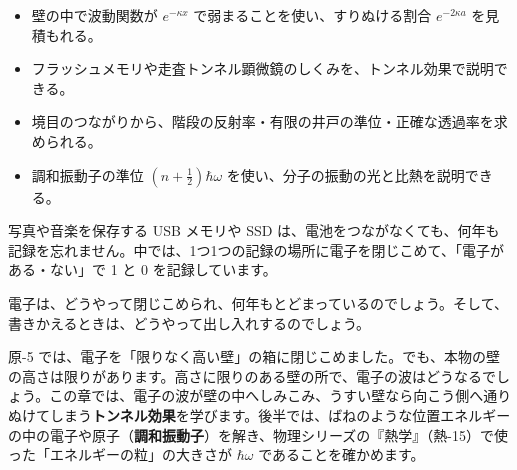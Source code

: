 \begin{goal}
\begin{itemize}[label={\color{bkTheme}●}, leftmargin=1.6\zw, itemsep=0pt, topsep=1pt]
\item {}\enspace 壁の中で波動関数が $e^{-\kappa x}$ で弱まることを使い、すりぬける割合 $e^{-2\kappa a}$ を見積もれる。
\item {}\enspace フラッシュメモリや走査トンネル顕微鏡のしくみを、トンネル効果で説明できる。
\item {}\enspace 境目のつながりから、階段の反射率・有限の井戸の準位・正確な透過率を求められる。
\item {}\enspace 調和振動子の準位 $(n+\tfrac12)\hbar\omega$ を使い、分子の振動の光と比熱を説明できる。
\end{itemize}
\end{goal}

\begin{hatena}
\noindent\begin{minipage}[c]{0.52\linewidth}\raggedright
写真や音楽を保存する USB メモリや SSD は、電池をつながなくても、何年も記録を忘れません。中では、1つ1つの記録の場所に電子を閉じこめて、「電子がある・ない」で 1 と 0 を記録しています。

電子は、どうやって閉じこめられ、何年もとどまっているのでしょう。そして、書きかえるときは、どうやって出し入れするのでしょう。
\end{minipage}\hfill
\begin{minipage}[c]{0.45\linewidth}\centering
{}
\end{minipage}
\end{hatena}

\noindent 原-5 では、電子を「限りなく高い壁」の箱に閉じこめました。でも、本物の壁の高さは限りがあります。高さに限りのある壁の所で、電子の波はどうなるでしょう。この章では、電子の波が壁の中へしみこみ、うすい壁なら向こう側へ通りぬけてしまう\textbf{トンネル効果}を学びます。後半では、ばねのような位置エネルギーの中の電子や原子（\textbf{調和振動子}）を解き、物理シリーズの『熱学』（熱-15）で使った「エネルギーの粒」の大きさが $\hbar\omega$ であることを確かめます。

